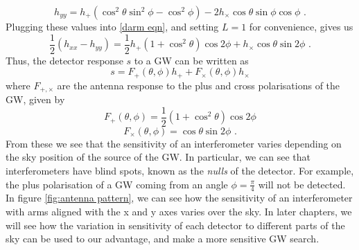 \documentclass[11pt]{cuthesis}
\newcommand{\fs}{\text{ .}}
\begin{document}
\begin{equation}
h_{yy} = h_+(\cos^2 \theta \sin^2 \phi - \cos^2 \phi) - 2h_\times \cos \theta \sin\phi \cos\phi \fs
\end{equation}
Plugging these values into \ref{darm eqn}, and setting $L=1$ for convenience, gives us
\begin{equation}
\frac{1}{2} (h_{xx} - h_{yy}) = \frac{1}{2} h_+ (1+\cos^2\theta)\cos 2\phi + h_\times \cos \theta \sin 2\phi \fs
\end{equation}
Thus, the detector response $s$ to a GW can be written as
\begin{equation}
s = F_+(\theta,\phi)h_+ + F_\times(\theta,\phi) h_\times
\end{equation}
where $F_{+,\times}$ are the antenna response to the plus and cross polarisations of the GW, given by
\begin{equation}
F_+(\theta,\phi) = \frac{1}{2} (1+\cos^2\theta)\cos 2\phi
\end{equation}
\begin{equation}
F_\times(\theta,\phi) = \cos \theta \sin 2\phi \fs
\end{equation}
From these we see that the sensitivity of an interferometer varies depending on the sky position of the source of the GW. In particular, we can see that interferometers have blind spots, known as the \textit{nulls} of the detector. For example, the plus polarisation of a GW coming from an angle $\phi=\frac{\pi}{4}$ will not be detected. In figure \ref{fig:antenna pattern}, we can see how the sensitivity of an interferometer with arms aligned with the x and y axes varies over the sky. In later chapters, we will see how the variation in sensitivity of each detector to different parts of the sky can be used to our advantage, and make a more sensitive GW search.



\end{document}
